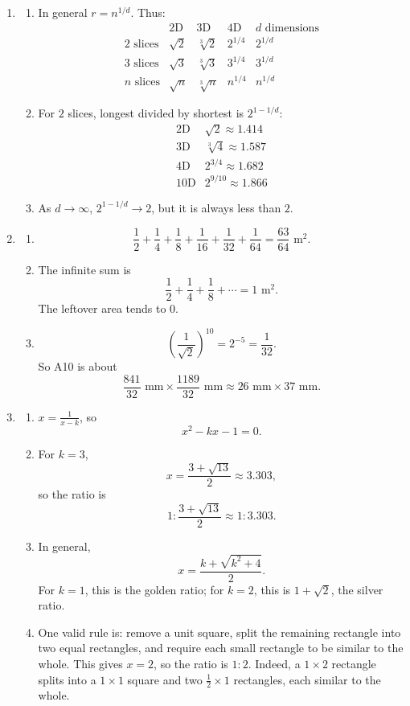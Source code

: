 \documentclass[11pt,a4paper]{article}
\begin{document}
\begin{enumerate}[label=\textbf{Q\arabic*.}, leftmargin=*, itemsep=0.8em]
\item
\begin{enumerate}[label=(\alph*)]
\item In general \(r=n^{1/d}\). Thus:
\[
\begin{array}{c|cccc}
 & \text{2D} & \text{3D} & \text{4D} & d\text{ dimensions}\\ \hline
2\text{ slices} & \sqrt2 & \sqrt[3]{2} & 2^{1/4} & 2^{1/d}\\
3\text{ slices} & \sqrt3 & \sqrt[3]{3} & 3^{1/4} & 3^{1/d}\\
n\text{ slices} & \sqrt n & \sqrt[3]{n} & n^{1/4} & n^{1/d}
\end{array}
\]
\item For \(2\) slices, longest divided by shortest is \(2^{1-1/d}\):
\[
\begin{array}{c|c}
2\text{D} & \sqrt2\approx1.414\\
3\text{D} & \sqrt[3]{4}\approx1.587\\
4\text{D} & 2^{3/4}\approx1.682\\
10\text{D} & 2^{9/10}\approx1.866
\end{array}
\]
\item As \(d\to\infty\), \(2^{1-1/d}\to2\), but it is always less than \(2\).
\end{enumerate}

\item
\begin{enumerate}[label=(\alph*)]
\item
\[
\frac12+\frac14+\frac18+\frac1{16}+\frac1{32}+\frac1{64}
=\frac{63}{64}\text{ m}^2.
\]
\item The infinite sum is
\[
\frac12+\frac14+\frac18+\cdots=1\text{ m}^2.
\]
The leftover area tends to \(0\).
\item
\[
\left(\frac1{\sqrt2}\right)^{10}=2^{-5}=\frac1{32}.
\]
So A10 is about
\[
\frac{841}{32}\text{ mm}\times\frac{1189}{32}\text{ mm}
\approx26\text{ mm}\times37\text{ mm}.
\]
\end{enumerate}

\item
\begin{enumerate}[label=(\alph*)]
\item \(x=\frac1{x-k}\), so
\[
x^2-kx-1=0.
\]
\item For \(k=3\),
\[
x=\frac{3+\sqrt{13}}2\approx3.303,
\]
so the ratio is
\[
1:\frac{3+\sqrt{13}}2\approx1:3.303.
\]
\item In general,
\[
x=\frac{k+\sqrt{k^2+4}}2.
\]
For \(k=1\), this is the golden ratio; for \(k=2\), this is \(1+\sqrt2\), the silver ratio.
\item One valid rule is: remove a unit square, split the remaining rectangle into two equal rectangles, and require each small rectangle to be similar to the whole. This gives \(x=2\), so the ratio is \(1:2\). Indeed, a \(1\times2\) rectangle splits into a \(1\times1\) square and two \(\frac12\times1\) rectangles, each similar to the whole.
\end{enumerate}

\end{enumerate}
\end{document}
